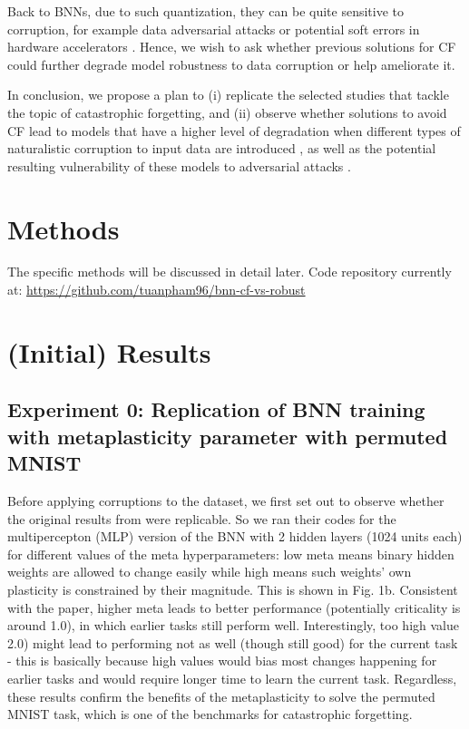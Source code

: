 \documentclass[manuscript,screen,review]{acmart}
\begin{document}
Back to BNNs, due to such quantization, they can be quite sensitive to corruption, for example data adversarial attacks \cite{Lin_2019} or potential soft errors in hardware accelerators \cite{Khoshavi2020}. Hence, we wish to ask whether previous solutions for CF \cite{Laborieux_Ernoult_Hirtzlin_Querlioz_2021} could further degrade model robustness to data corruption or help ameliorate it.

In conclusion, we propose a plan to (i) replicate the selected studies that tackle the topic of catastrophic forgetting, and (ii) observe whether solutions to avoid CF lead to models that have a higher level of degradation when different types of naturalistic corruption to input data are introduced \cite{Hendrycks_2018}, as well as the potential resulting vulnerability of these models to adversarial attacks \cite{Lin_2019}.

\section{Methods}
The specific methods will be discussed in detail later. Code repository currently at: 
\url{https://github.com/tuanpham96/bnn-cf-vs-robust}

\section{(Initial) Results}
\subsection{Experiment 0: Replication of BNN training with metaplasticity parameter with permuted MNIST
}

Before applying corruptions to the dataset, we first set out to observe whether the original results from \cite{Laborieux_Ernoult_Hirtzlin_Querlioz_2021} were replicable. So we ran their codes for the multipercepton (MLP) version of the BNN with 2 hidden layers (1024 units each) for different values of the meta hyperparameters: low meta means binary hidden weights are allowed to change easily while high means such weights’ own plasticity is constrained by their magnitude. This is shown in Fig. 1b. Consistent with the paper, higher meta leads to better performance (potentially criticality is around 1.0), in which earlier tasks still perform well. Interestingly, too high value 2.0) might lead to performing not as well (though still good) for the current task - this is basically because high values would bias most changes happening for earlier tasks and would require longer time to learn the current task. Regardless, these results confirm the benefits of the metaplasticity to solve the permuted MNIST task, which is one of the benchmarks for catastrophic forgetting. 
\end{document}
